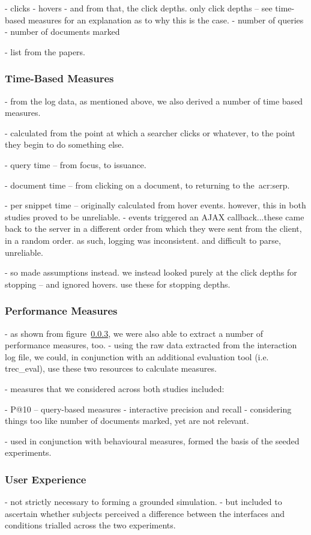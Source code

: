 - clicks
- hovers
- and from that, the click depths. only click depths -- see time-based measures for an explanation as to why this is the case.
- number of queries
- number of documents marked

- list from the papers.

\subsubsection{Time-Based Measures}
- from the log data, as mentioned above, we also derived a number of time based measures.

- calculated from the point at which a searcher clicks or whatever, to the point they begin to do something else.

- query time -- from focus, to issuance.

- document time -- from clicking on a document, to returning to the~\gls{acr:serp}.

- per snippet time -- originally calculated from hover events. however, this in both studies proved to be unreliable.
- events triggered an AJAX callback...these came back to the server in a different order from which they were sent from the client, in a random order. as such, logging was inconsistent. and difficult to parse, unreliable.

- so made assumptions instead. we instead looked purely at the click depths for stopping -- and ignored hovers. use these for stopping depths.

\subsubsection{Performance Measures}
- as shown from figure~\ref{}, we were also able to extract a number of performance measures, too.
- using the raw data extracted from the interaction log file, we could, in conjunction with an additional evaluation tool (i.e. trec\_eval), use these two resources to calculate measures.

- measures that we considered across both studies included:

- P@10 -- query-based measures
- interactive precision and recall
- considering things too like number of documents marked, yet are not relevant.

- used in conjunction with behavioural measures, formed the basis of the seeded experiments.

\subsubsection{User Experience}
- not strictly necessary to forming a grounded simulation.
- but included to ascertain whether subjects perceived a difference between the interfaces and conditions trialled across the two experiments.

